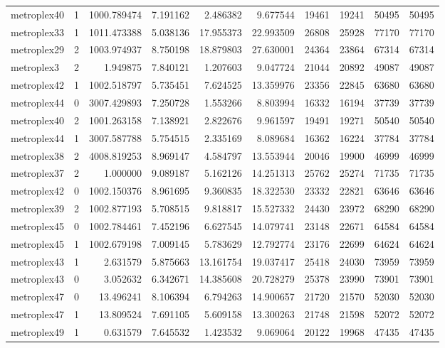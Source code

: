 \begin{longtable}{|l|r|r|r|r|r|r|r|r|r|}
metroplex40 & 1 & 1000.789474 & 7.191162 & 2.486382 & 9.677544 & 19461 & 19241 & 50495 & 50495 \\
metroplex33 & 1 & 1011.473388 & 5.038136 & 17.955373 & 22.993509 & 26808 & 25928 & 77170 & 77170 \\
metroplex29 & 2 & 1003.974937 & 8.750198 & 18.879803 & 27.630001 & 24364 & 23864 & 67314 & 67314 \\
metroplex3 & 2 & 1.949875 & 7.840121 & 1.207603 & 9.047724 & 21044 & 20892 & 49087 & 49087 \\
metroplex42 & 1 & 1002.518797 & 5.735451 & 7.624525 & 13.359976 & 23356 & 22845 & 63680 & 63680 \\
metroplex44 & 0 & 3007.429893 & 7.250728 & 1.553266 & 8.803994 & 16332 & 16194 & 37739 & 37739 \\
metroplex40 & 2 & 1001.263158 & 7.138921 & 2.822676 & 9.961597 & 19491 & 19271 & 50540 & 50540 \\
metroplex44 & 1 & 3007.587788 & 5.754515 & 2.335169 & 8.089684 & 16362 & 16224 & 37784 & 37784 \\
metroplex38 & 2 & 4008.819253 & 8.969147 & 4.584797 & 13.553944 & 20046 & 19900 & 46999 & 46999 \\
metroplex37 & 2 & 1.000000 & 9.089187 & 5.162126 & 14.251313 & 25762 & 25274 & 71735 & 71735 \\
metroplex42 & 0 & 1002.150376 & 8.961695 & 9.360835 & 18.322530 & 23332 & 22821 & 63646 & 63646 \\
metroplex39 & 2 & 1002.877193 & 5.708515 & 9.818817 & 15.527332 & 24430 & 23972 & 68290 & 68290 \\
metroplex45 & 0 & 1002.784461 & 7.452196 & 6.627545 & 14.079741 & 23148 & 22671 & 64584 & 64584 \\
metroplex45 & 1 & 1002.679198 & 7.009145 & 5.783629 & 12.792774 & 23176 & 22699 & 64624 & 64624 \\
metroplex43 & 1 & 2.631579 & 5.875663 & 13.161754 & 19.037417 & 25418 & 24030 & 73959 & 73959 \\
metroplex43 & 0 & 3.052632 & 6.342671 & 14.385608 & 20.728279 & 25378 & 23990 & 73901 & 73901 \\
metroplex47 & 0 & 13.496241 & 8.106394 & 6.794263 & 14.900657 & 21720 & 21570 & 52030 & 52030 \\
metroplex47 & 1 & 13.809524 & 7.691105 & 5.609158 & 13.300263 & 21748 & 21598 & 52072 & 52072 \\
metroplex49 & 1 & 0.631579 & 7.645532 & 1.423532 & 9.069064 & 20122 & 19968 & 47435 & 47435 \\

\end{longtable}
